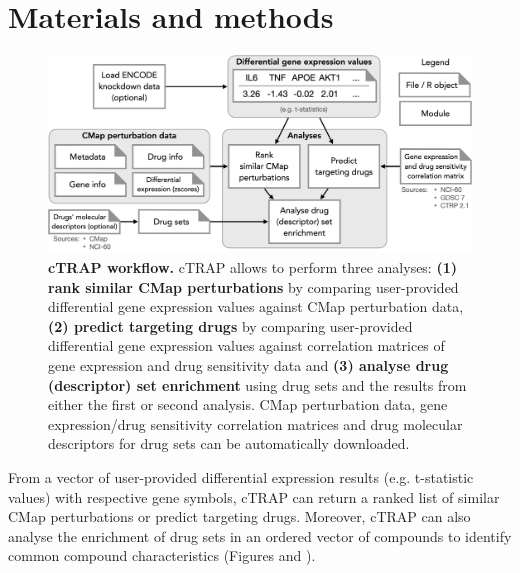 \section{Materials and methods}

\begin{figure}[!b]
  \includegraphics[width=.8\textwidth]{images/ctrap/workflow}
  \centering
  \caption[cTRAP workflow]{\textbf{cTRAP workflow.} cTRAP allows to perform three analyses: \textbf{(1) rank similar CMap perturbations} by comparing user-provided differential gene expression values against CMap perturbation data, \textbf{(2) predict targeting drugs} by comparing user-provided differential gene expression values against correlation matrices of gene expression and drug sensitivity data and \textbf{(3) analyse drug (descriptor) set enrichment} using drug sets and the results from either the first or second analysis. CMap perturbation data, gene expression/drug sensitivity correlation matrices and drug molecular descriptors for drug sets can be automatically downloaded.}
  \label{fig:ctrap-workflow}
\end{figure}

From a vector of user-provided differential expression results (e.g. t-statistic values) with respective gene symbols, cTRAP can return a ranked list of similar CMap perturbations or predict targeting drugs. Moreover, cTRAP can also analyse the enrichment of drug sets in an ordered vector of compounds to identify common compound characteristics (Figures  and ).

